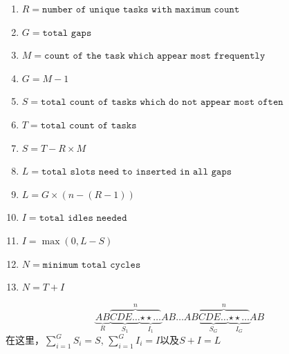 \documentclass[a4paper,12pt]{article}
\begin{document}
\begin{CJK*}{UTF8}{gbsn}
\begin{itemize}
		\begin{enumerate}
			\item $R = \texttt{number of unique tasks with maximum count}$
			\item $G = \texttt{total gaps}$
			\item $M = \texttt{count of the task which appear most frequently}$
			\item $G = M - 1$
			\item $S = \texttt{total count of tasks which do not appear most often}$
			\item $T = \texttt{total count of tasks}$
			\item $S = T - R \times M$
			\item $L = \texttt{total slots need to inserted in all gaps}$\
			\item $L = G \times (n - (R-1))$
			\item $I = \texttt{total idles needed}$
			\item  $I = \max(0, L - S)$
			\item $N = \texttt{minimum total cycles}$
			\item $N = T + I$
		\end{enumerate}
	
	$$
	\underbrace{AB}_{R}\overbrace{\underbrace{CDE\ldots}_{S_{1}}\underbrace{\star\star\ldots}_{I_{1}}}^{n}AB\ldots AB\overbrace{\underbrace{CDE\ldots}_{S_{G}}\underbrace{\star\star\ldots}_{I_{G}}}^{n}AB
	$$
	在这里，$\sum\limits_{i=1}^{G}S_{i} = S$, $\sum\limits_{i=1}^{G}I_{i} = I$以及$S+I = L$
	\end{itemize}
\clearpage
\end{CJK*}
\end{document}
